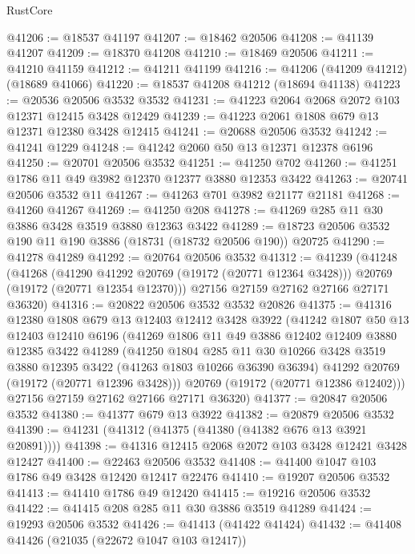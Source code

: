 \begin{lexlean}{RustCore}
\begin{coremodule}
@41206 := @18537 @41197
@41207 := @18462 @20506
@41208 := @41139 @41207
@41209 := @18370 @41208
@41210 := @18469 @20506
@41211 := @41210 @41159
@41212 := @41211 @41199
@41216 := @41206 (@41209 @41212) (@18689 @41066)
@41220 := @18537 @41208 @41212 (@18694 @41138)
@41223 := @20536 @20506 @3532 @3532
@41231 := @41223 @2064 @2068 @2072 @103 @12371 @12415 @3428 @12429
@41239 := @41223 @2061 @1808 @679 @13 @12371 @12380 @3428 @12415
@41241 := @20688 @20506 @3532
@41242 := @41241 @1229
@41248 := @41242 @2060 @50 @13 @12371 @12378 @6196
@41250 := @20701 @20506 @3532
@41251 := @41250 @702
@41260 := @41251 @1786 @11 @49 @3982 @12370 @12377 @3880 @12353 @3422
@41263 := @20741 @20506 @3532 @11
@41267 := @41263 @701 @3982 @21177 @21181
@41268 := @41260 @41267
@41269 := @41250 @208
@41278 := @41269 @285 @11 @30 @3886 @3428 @3519 @3880 @12363 @3422
@41289 := @18723 @20506 @3532 @190 @11 @190 @3886 (@18731 (@18732 @20506 @190)) @20725
@41290 := @41278 @41289
@41292 := @20764 @20506 @3532
@41312 := @41239
    (@41248
      (@41268
        (@41290 @41292 @20769 (@19172 (@20771 @12364 @3428)))
        @20769
        (@19172 (@20771 @12354 @12370)))
      @27156
      @27159
      @27162
      @27166
      @27171
      @36320)
@41316 := @20822 @20506 @3532 @3532 @20826
@41375 := @41316
    @12380
    @1808
    @679
    @13
    @12403
    @12412
    @3428
    @3922
    (@41242
      @1807
      @50
      @13
      @12403
      @12410
      @6196
      (@41269
        @1806
        @11
        @49
        @3886
        @12402
        @12409
        @3880
        @12385
        @3422
        @41289
        (@41250
          @1804
          @285
          @11
          @30
          @10266
          @3428
          @3519
          @3880
          @12395
          @3422
          (@41263 @1803 @10266 @36390 @36394)
          @41292
          @20769
          (@19172 (@20771 @12396 @3428)))
        @20769
        (@19172 (@20771 @12386 @12402)))
      @27156
      @27159
      @27162
      @27166
      @27171
      @36320)
@41377 := @20847 @20506 @3532
@41380 := @41377 @679 @13 @3922
@41382 := @20879 @20506 @3532
@41390 := @41231 (@41312 (@41375 (@41380 (@41382 @676 @13 @3921 @20891))))
@41398 := @41316 @12415 @2068 @2072 @103 @3428 @12421 @3428 @12427
@41400 := @22463 @20506 @3532
@41408 := @41400 @1047 @103 @1786 @49 @3428 @12420 @12417 @22476
@41410 := @19207 @20506 @3532
@41413 := @41410 @1786 @49 @12420
@41415 := @19216 @20506 @3532
@41422 := @41415 @208 @285 @11 @30 @3886 @3519 @41289
@41424 := @19293 @20506 @3532
@41426 := @41413 (@41422 @41424)
@41432 := @41408 @41426 (@21035 (@22672 @1047 @103 @12417))

\end{coremodule}
\end{lexlean}
